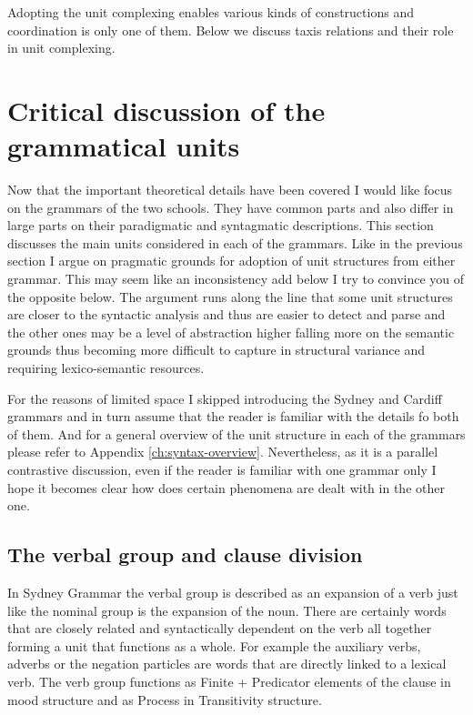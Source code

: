 
Adopting the unit complexing enables various kinds of constructions and coordination is only one of them. Below we discuss taxis relations and their role in unit complexing.

\section{Critical discussion of the grammatical units}
\label{sec:discussion-unit-classes}

Now that the important theoretical details have been covered I would like focus on the grammars of the two schools. They have common parts and also differ in large parts on their paradigmatic and syntagmatic descriptions. This section discusses the main units considered in each of the grammars. Like in the previous section I argue on pragmatic grounds for adoption of unit structures from either grammar. This may seem like an inconsistency add below I try to convince you of the opposite below. The argument runs along the line that some unit structures are closer to the syntactic analysis and thus are easier to detect and parse and the other ones may be a level of abstraction higher falling more on the semantic grounds thus becoming more difficult to capture in structural variance and requiring lexico-semantic resources.

For the reasons of limited space I skipped introducing the Sydney and Cardiff grammars and in turn assume that the reader is familiar with the details fo both of them. And for a general overview of the unit structure in each of the grammars please refer to Appendix \ref{ch:syntax-overview}. Nevertheless, as it is a parallel contrastive discussion, even if the reader is familiar with one grammar only I hope it becomes clear how does certain phenomena are dealt with in the other one. 

\subsection{The verbal group and clause division}
\label{sec:verbal-grpoup-and-clause-division}
In Sydney Grammar the verbal group is described as an expansion of a verb just like the nominal group is the expansion of the noun\citep[396]{Halliday2013}. There are certainly words that are closely related and syntactically dependent on the verb all together forming a unit that functions as a whole. For example the auxiliary verbs, adverbs or the negation particles are words that are directly linked to a lexical verb. The verb group functions as Finite + Predicator elements of the clause in mood structure and as Process in Transitivity structure. 

